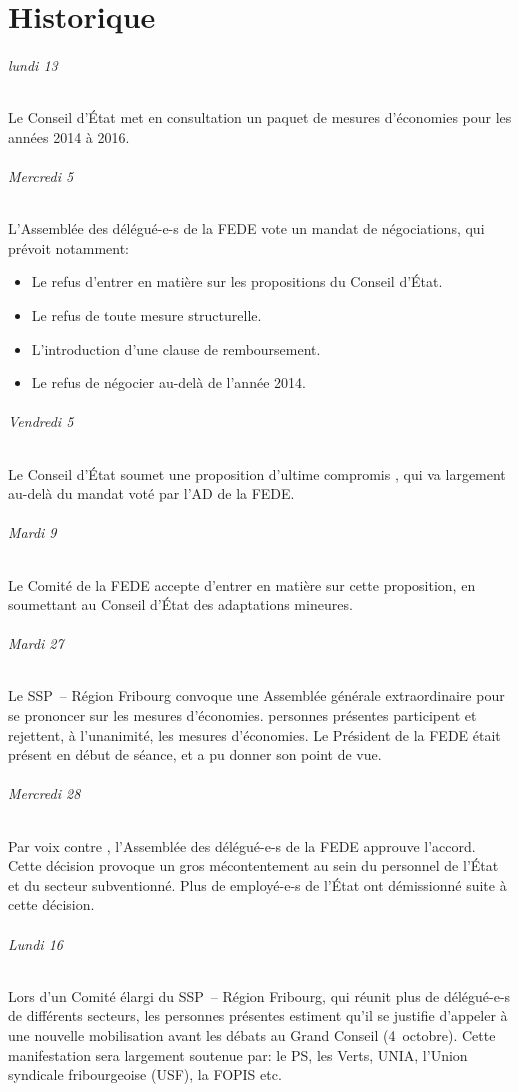 
\chapter{Historique}%
\subparagraph{lundi 13}%
Le Conseil d'État met en consultation un paquet de mesures d'économies pour les années 2014 à 2016.

\subparagraph{Mercredi 5}%
L'Assemblée des délégué-e-s de la FEDE vote un mandat de négociations, qui prévoit notamment:
\begin{itemize}
	\item Le refus d'entrer en matière sur les propositions du Conseil d'État.
	\item Le refus de toute mesure structurelle.
	\item L'introduction d'une clause de remboursement.
	\item Le refus de négocier au-delà de l'année 2014.
\end{itemize}

\subparagraph{Vendredi 5}%
Le Conseil d'État soumet une proposition d'\og ultime compromis \fg,
	qui va largement au-delà du mandat voté par l'AD de la FEDE.

\subparagraph{Mardi 9}%
Le Comité de la FEDE accepte d'entrer en matière sur cette proposition, en soumettant au Conseil
	d'État des adaptations mineures.

\subparagraph{Mardi 27}%
Le SSP~– Région Fribourg convoque une Assemblée générale extraordinaire pour se prononcer sur les
	mesures d'économies.
 personnes présentes participent et rejettent, à l'unanimité, les mesures d'économies.
Le Président de la FEDE était présent en début de séance, et a pu donner son point de vue.

\subparagraph{Mercredi 28}%
Par  voix contre , l'Assemblée des délégué-e-s de la FEDE approuve l'accord.
Cette décision provoque un gros mécontentement au sein du personnel de l'État et du secteur
	subventionné.
Plus de  employé-e-s de l'État ont démissionné suite à cette décision.

\subparagraph{Lundi 16}%
Lors d'un \og Comité élargi \fg du SSP~– Région Fribourg, qui réunit plus de  délégué-e-s de
	différents secteurs,
les personnes présentes estiment qu'il se justifie d'appeler à une nouvelle mobilisation avant les
	débats au Grand Conseil (4~octobre).
Cette manifestation sera largement soutenue par: le PS, les Verts, UNIA, l'Union syndicale
	fribourgeoise (USF), la FOPIS etc.

